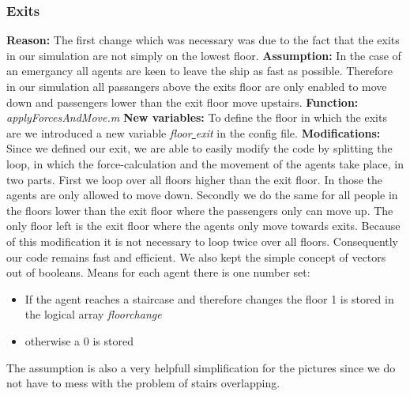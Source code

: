 \documentclass[11pt]{article}
\begin{document}
\subsubsection{Exits}
\textbf{Reason:}
\newline
The first change which was necessary was due to the fact that the exits in our simulation are not simply on the lowest floor.
\newline
\textbf{Assumption:}
\newline
In the case of an emergancy all agents are keen to leave the ship as fast as possible. Therefore in our simulation all passangers above the exits floor are only enabled to move down and passengers lower than the exit floor move upstairs.
\newline
\textbf{Function:}
\newline
\textit{applyForcesAndMove.m}
\newline
\textbf{New variables:}
\newline 
To define the floor in which the exits are we introduced a new variable \textit{floor\underline{ }exit} in the config file.
\newline
\textbf{Modifications:}
\newline
Since we defined our exit, we are able to easily modify the code by splitting the loop, in which the force-calculation and the movement of the agents take place, in two parts. First we loop over all floors higher than the exit floor. In those the agents are only allowed to move down. Secondly we do the same for all people in the floors lower than the exit floor where the passengers only can move up. The only floor left is the exit floor where the agents only move towards exits.
\newline
Because of this modification it is not necessary to loop twice over all floors. Consequently our code remains fast and efficient. We also kept the simple concept of vectors out of booleans. Means for each agent there is one number set: 
\begin{itemize}
\item If the agent reaches a staircase and therefore changes the floor 1 is stored in the logical array \textit{floorchange}
\item otherwise a 0 is stored
\end{itemize}
The assumption is also a very helpfull simplification for the pictures since we do not have to mess with the problem of stairs overlapping.
\end{document}
